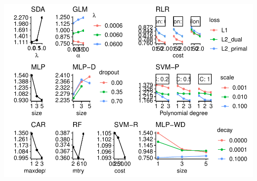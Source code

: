 \documentclass[
]{article}
\begin{document}
\includegraphics{sl-inf-cairs-2301_files/figure-latex/optResults-11.pdf}
\end{document}

